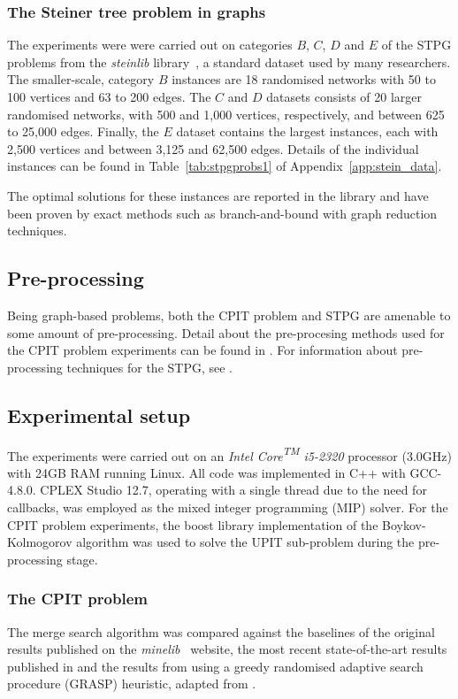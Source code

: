 \documentclass[preprint]{elsarticle}
\begin{document}
\subsubsection*{\textbf{The Steiner tree problem in graphs}}

The experiments were were carried out on categories $B$, $C$, $D$ and $E$ of the STPG problems from the \textit{steinlib} library~\citep{steinlib}, a standard dataset used by many researchers. The smaller-scale, category $B$ instances are 18 randomised networks with 50 to 100 vertices and 63 to 200 edges. The $C$ and $D$ datasets consists of 20 larger randomised networks, with 500 and 1,000 vertices, respectively, and between 625 to 25,000 edges. Finally, the $E$ dataset contains the largest instances, each with 2,500 vertices and between 3,125 and 62,500 edges. Details of the individual instances can be found in Table~\ref{tab:stpgprobs1} of Appendix~\ref{app:stein_data}. 

The optimal solutions for these instances are reported in the library and 
have been proven by exact methods such as branch-and-bound with graph reduction techniques.\par



\subsection{Pre-processing}
Being graph-based problems, both the CPIT problem and STPG are amenable to some amount of pre-processing. Detail about the pre-procesing methods used for the CPIT problem experiments can be found in \citet{gecco17}. For information about pre-processing techniques for the STPG, see \citet{pp:duin,pp:uchoa,stpg-reduce}.

\subsection{Experimental setup}
The experiments were carried out on an \emph{Intel{\textsuperscript{\textregistered}} Core{\textsuperscript{TM}} i5-2320} processor (3.0GHz) with 24GB RAM running Linux. All code was implemented in C++ with GCC-4.8.0. CPLEX Studio 12.7, operating with a single thread due to the need for callbacks, was employed as the mixed integer programming (MIP) solver. For the CPIT problem experiments, the boost library implementation of the Boykov-Kolmogorov algorithm was used to solve the UPIT sub-problem during the pre-processing stage.

\subsubsection*{\textbf{The CPIT problem}}
The merge search algorithm was compared against the baselines of the original results published on the \emph{minelib}~\citep{minelib} website, the most recent state-of-the-art results published in \citet{minelib-improved} and the results from using a greedy randomised adaptive search procedure (GRASP) heuristic, adapted from \citet{gecco17}. 
\end{document}
